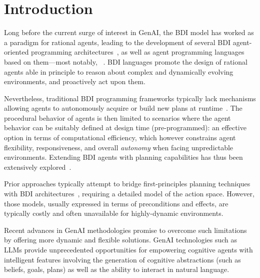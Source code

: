 \documentclass[12pt,a4paper,openright,twoside]{book}
\begin{document}
\chapter{Introduction}\label{chap:introduction}

Long before the current surge of interest in \ac{GenAI}, the \ac{BDI} model has worked as a paradigm for rational agents, leading to the development of several \ac{BDI} agent-oriented programming architectures~\cite{RaoG95}, as well as agent programming languages based on them---most notably, \agentspeak{}~\cite{rao-agentspeak96}.
%
\ac{BDI} languages promote the design of rational agents able in principle to reason about complex and dynamically evolving environments, and proactively act upon them.

Nevertheless, traditional \ac{BDI} programming frameworks typically lack mechanisms allowing agents to autonomously acquire or build new plans at runtime~\cite{SilvaSP09}.
%
The procedural behavior of \agentspeak{} agents is then limited to scenarios where the agent behavior can be suitably defined at design time (pre-programmed): an effective option in terms of computational efficiency, which however constrains agent flexibility, responsiveness, and overall \emph{autonomy} when facing unpredictable environments.
%
Extending \ac{BDI} agents with planning capabilities has thus been extensively explored~\cite{MeneguzziS15}.

Prior approaches typically attempt to bridge first-principles planning techniques with \ac{BDI} architectures~\cite{SilvaSP09}, requiring a detailed model of the action space.
%
However, those models, usually expressed in terms of preconditions and effects, are typically costly and often unavailable for highly-dynamic environments.

Recent advances in \ac{GenAI} methodologies promise to overcome such limitations by offering more dynamic and flexible solutions.
%
\ac{GenAI} technologies such as \acp{LLM} provide unprecedented opportunities for empowering cognitive agents with intelligent features involving the generation of cognitive abstractions (such as beliefs, goals, plans) as well as the ability to interact in natural language.
\end{document}
